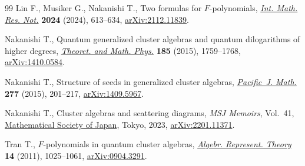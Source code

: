 \documentclass[pdftex]{sigma}
\numberwithin{equation}{section}
\begin{document}
\begin{thebibliography}{99}
Lin F., Musiker G., Nakanishi T., Two formulas for {$F$}-polynomials,
   \href{https://doi.org/10.1093/imrn/rnad074}{\textit{Int. Math. Res. Not.}} \textbf{2024} (2024), 613--634,
  \href{https://arxiv.org/abs/2112.11839}{arXiv:2112.11839}.

Nakanishi T., Quantum generalized cluster algebras and quantum dilogarithms of
  higher degrees, \href{https://doi.org/10.1007/s11232-015-0377-9}{\textit{Theoret. and Math. Phys.}} \textbf{185} (2015),
  1759--1768, \href{https://arxiv.org/abs/1410.0584}{arXiv:1410.0584}.

Nakanishi T., Structure of seeds in generalized cluster algebras,
  \href{https://doi.org/10.2140/pjm.2015.277.201}{\textit{Pacific~J. Math.}} \textbf{277} (2015), 201--217, \href{https://arxiv.org/abs/1409.5967}{arXiv:1409.5967}.

Nakanishi T., Cluster algebras and scattering diagrams, \textit{MSJ Memoirs}, Vol.~41, \href{https://doi.org/10.1142/e073}{Mathematical Society of Japan}, Tokyo, 2023, \href{https://arxiv.org/abs/2201.11371}{arXiv:2201.11371}.

Tran T., {$F$}-polynomials in quantum cluster algebras,  \href{https://doi.org/10.1007/s10468-010-9226-6}{\textit{Algebr.
  Represent. Theory}} \textbf{14} (2011), 1025--1061, \href{https://arxiv.org/abs/0904.3291}{arXiv:0904.3291}.

\end{thebibliography}\LastPageEnding
\end{document}
